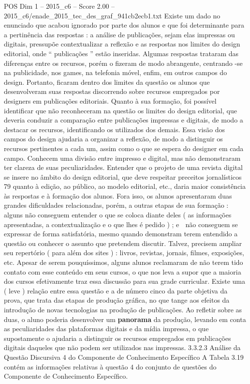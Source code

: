 \begin{textsample}{POS Dim 1 – 2015\_c6 – Score 2.00 – 2015\_c6/enade\_2015\_tec\_des\_graf\_941cb2ecb1.txt}
Existe um dado no enunciado que acabou ignorado por parte dos alunos e que foi determinante para a pertinência das respostas : a análise de publicações, sejam elas impressas ou digitais, pressupõe contextualizar a reflexão e as respostas nos limites do design editorial, onde “ publicações ” estão inseridas.
Algumas respostas trataram das diferenças entre os recursos, porém o fizeram de modo abrangente, centrando -se na publicidade, nos games, na telefonia móvel, enfim, em outros campos do design.
Portanto, ficaram dentro dos limites da questão os alunos que desenvolveram suas respostas discorrendo sobre recursos empregados por designers em publicações editoriais.
Quanto à sua formação, foi possível identificar que não reconheceram na questão os limites do design editorial, que deveria conduzir a comparação entre publicações impressas e digitais, de modo a destacar os recursos, identificando os utilizados dos demais.
Essa visão dos campos do design ajudaria a organizar a reflexão, de modo a distinguir os recursos pertinentes a cada um, assim como o que se espera do designer em cada campo.
Conhecem uma divisão entre impresso e digital, mas não demonstraram ter clareza de suas peculiaridades.
Entender que o projeto de uma revista digital se insere no âmbito do design editorial, que deve respeitar preceitos jornalísticos 79 quanto à edição, ao público, ao modelo editorial, etc., daria maior consistência às respostas e à formação dos alunos.
Fora isso, os alunos apresentaram duas grandes dificuldades relacionadas, porém, a outras etapas de sua formação :  alguns não conseguem entender o que se coloca diante deles ( as informações apresentadas, a contextualização e o que lhes é pedido ) ; e  não conseguem se expressar de forma satisfatória, mesmo quando demonstram terem entendido a questão ou conhecer o assunto que pretendem discutir.
Talvez, precisem ampliar seu repertório ( para além dos sites ) : livros, revistas, jornais, filmes, exposições, etc.
Apesar de serem pouquíssimos, alguns alunos reclamaram de não terem tido contato com esse conteúdo em seus cursos, o que nos leva a supor que a maioria dos cursos efetivamente traz essa discussão para sua grade curricular.
Existe uma ( leve ) relação entre essa questão e a de número cinco da parte objetiva da prova, que trata das etapas de produção gráfica, no que tange aos efeitos da introdução de novas tecnologias na produção de publicações.
Ao refletir sobre as duas, o aluno poderia desenvolver um \textbf{panorama} da produção, levando em conta as peculiaridades das plataformas digitais e da mídia impressa, o que supostamente o ajudaria a distinguir os recursos empregados em publicações digitais daqueles que não podem ser utilizados nas impressas. 3.3.2.3 Análise da Questão Discursiva 4 do Componente de Conhecimento Específico A Tabela 3.19 contém as informações relativas à questão 4 do conjunto de questões do Componente de Conhecimento Específico.

\end{textsample}

